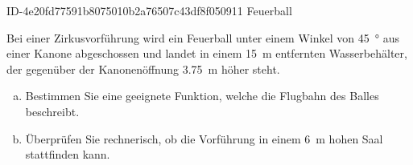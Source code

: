 \begin{exercise}
      {ID-4e20fd77591b8075010b2a76507c43df8f050911}
      {Feuerball}
  \ifproblem\problem\par
    Bei einer Zirkusvorführung wird ein Feuerball
    unter einem Winkel von \SI{45}{\degree} aus
    einer \glqq Kanone\grqq{} abgeschossen und
    landet in einem \SI{15}{\metre} entfernten
    Wasserbehälter, der gegenüber der
    Kanonenöffnung \SI{3.75}{\metre} höher steht.
    \begin{enumerate}[a)]
      \item Bestimmen Sie eine geeignete Funktion, welche
            die Flugbahn des Balles beschreibt.
      \item Überprüfen Sie rechnerisch, ob die
            Vorführung in einem \SI{6}{\metre} hohen
            Saal stattfinden kann.
    \end{enumerate}
  \fi
\end{exercise}
